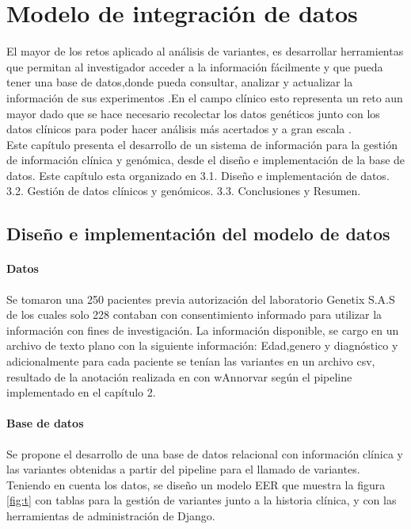 \chapter{Modelo de integración de datos}

El mayor de los retos aplicado al análisis de variantes, es desarrollar herramientas que permitan al investigador acceder a la información fácilmente y que pueda tener una base de datos,donde pueda consultar, analizar y actualizar la información de sus experimentos \cite{Li2014}.En el campo clínico esto representa un reto aun mayor dado que se hace necesario recolectar los datos genéticos junto con los datos clínicos para poder hacer análisis más acertados y a gran escala \cite{Paila2013}.\\


Este capítulo presenta el desarrollo de un sistema de información para la gestión de información clínica y genómica, desde el diseño e implementación de la base de datos. Este capítulo esta  organizado en 3.1. Diseño e implementación de datos. 3.2. Gestión de datos clínicos y genómicos. 3.3. Conclusiones y  Resumen.

\section{Diseño e implementación del modelo de datos}

\subsubsection{Datos}

Se tomaron una  250 pacientes previa autorización  del laboratorio Genetix S.A.S de los cuales solo 228 contaban con consentimiento informado para utilizar la información con fines de investigación.  La información disponible, se cargo en un archivo de texto plano con la siguiente información: Edad,genero y diagnóstico y adicionalmente para cada paciente se tenían las variantes en un archivo csv, resultado de la anotación realizada en con wAnnorvar según el pipeline implementado en el capítulo 2.\\

\subsubsection{Base de datos}

Se propone el desarrollo de una base de datos relacional con información clínica  y las variantes obtenidas a partir del pipeline para el llamado de variantes. Teniendo en cuenta los datos, se diseño un modelo EER que muestra la figura \ref{fig:t} con tablas para la gestión de variantes junto a la historia clínica, y con las herramientas de administración de Django.

